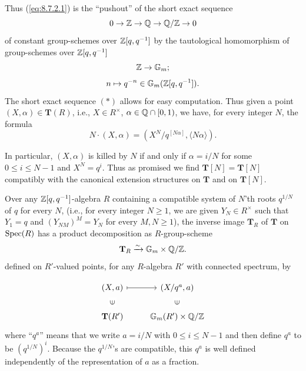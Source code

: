 Thus (\ref{eq:8.7.2.1}) is the ``pushout'' of the short exact sequence
\begin{equation}\label{eq:8.7.2.7}
0 \to \mathbb{Z} \to \mathbb{Q} \to \mathbb{Q}/\mathbb{Z} \to 0
\end{equation}
of constant group-schemes over $\mathbb{Z}[q,q^{-1}]$ by the tautological homomorphism of group-schemes over $\mathbb{Z}[q,q^{-1}]$
\[
\mathbb{Z} \to \mathbb{G}_m ;
\]
\[
n \mapsto q^{-n} \in \mathbb{G}_m(\mathbb{Z}[q,q^{-1}]) .
\]
The short exact sequence $(*)$ allows for easy computation. Thus given a point $(X, \alpha) \in \mathbf{T}(R)$, i.e., $X \in R^{\times}$, $\alpha \in \mathbb{Q} \cap [0,1)$, we have, for every integer $N$, the formula
\begin{equation}\label{eq:8.7.2.8}
N \cdot (X, \alpha) = (X^N/q^{[N\alpha]}, \langle N\alpha \rangle) .
\end{equation}

\kmitem\label{item:8.7.3}
In particular, $(X, \alpha)$ is killed by $N$ if and only if $\alpha = i/N$ for some $0 \le i \le N-1$ and $X^N = q^i$. Thus as promised we find $\mathbf{T}[N] = \mathbf{T}[N]$ compatibly with the canonical extension structures on $\mathbf{T}$ and on $\mathbf{T}[N]$.

\kmitem\label{item:8.7.4}
Over any $\mathbb{Z}[q,q^{-1}]$-algebra $R$ containing a compatible system of $N$'th roots $q^{1/N}$ of $q$ for every $N$, (i.e., for every integer $N \ge 1$, we are given $Y_N \in R^{\times}$ such that $Y_1 = q$ and $(Y_{NM})^M = Y_N$ for every $M,N \ge 1$), the inverse image $\mathbf{T}_R$ of $\mathbf{T}$ on $\operatorname{Spec}(R)$ has a product decomposition as $R$-group-scheme
\begin{equation}\label{eq:8.7.4.1}
\mathbf{T}_R \xrightarrow{\sim} \mathbb{G}_m \times \mathbb{Q}/\mathbb{Z} .
\end{equation}
defined on $R'$-valued points, for any $R$-algebra $R'$ with connected spectrum, by
\addtocounter{equation}{-1}
\begin{equation}
\begin{tikzcd}
(X, a) \arrow[r, mapsto] & (X/q^a, a) \\
\mathbf{T}(R') \arrow[u, "\rotatebox{90}{$\in$}" description, phantom] & \mathbb{G}_m(R') \times \Q/\Z \arrow[u, "\rotatebox{90}{$\in$}" description, phantom]
\end{tikzcd}
\end{equation}
where ``$q^a$'' means that we write $a = i/N$ with $0 \le i \le N-1$ and then define $q^a$ to be $(q^{1/N})^i$. Because the $q^{1/N}$'s are compatible, this $q^a$ is well defined independently of the representation of $a$ as a fraction.

